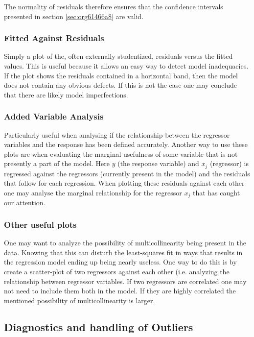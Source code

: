 \documentclass[11pt]{article}
\begin{document}
The normality of residuals therefore ensures that the confidence intervals presented in section \ref{sec:org61466a8}
are valid.

\subsubsection{Fitted Against Residuals}
\label{sec:orgf78f7d9}

Simply a plot of the, often externally studentized, residuals versus the fitted values. This is useful
because it allows an easy way to detect model inadequacies. If the plot shows the residuals contained in
a horizontal band, then the model does not contain any obvious defects. If this is not the case one may
conclude that there are likely model imperfections.

\subsubsection{Added Variable Analysis}
\label{sec:orgd26e977}

Particularly useful when analysing if the relationship between the regressor variables and the response
has been defined accurately. Another way to use these plots are when evaluating the marginal usefulness
of some variable that is not presently a part of the model. Here \(y\) (the response variable) and \(x_j\)
(regressor) is regressed against the regressors (currently present in the model) and the residuals that
follow for each regression. When plotting these residuals against each other one may analyse the marginal
relationship for the regressor \(x_j\) that has caught our attention.

\subsubsection{Other useful plots}
\label{sec:org44d7776}

One may want to analyze the possibility of multicollinearity being present in the data. Knowing that
this can disturb the least-squares fit in ways that results in the regression model ending up being
nearly useless. One way to do this is by create a scatter-plot of two regressors against each other
(i.e. analyzing the relationship between regressor variables. If two regressors are correlated one 
may not need to include them both in the model. If they are highly correlated the mentioned possibility 
of multicollinearity is larger. 

\subsection{Diagnostics and handling of Outliers}
\label{sec:org20bf5df}
\end{document}

